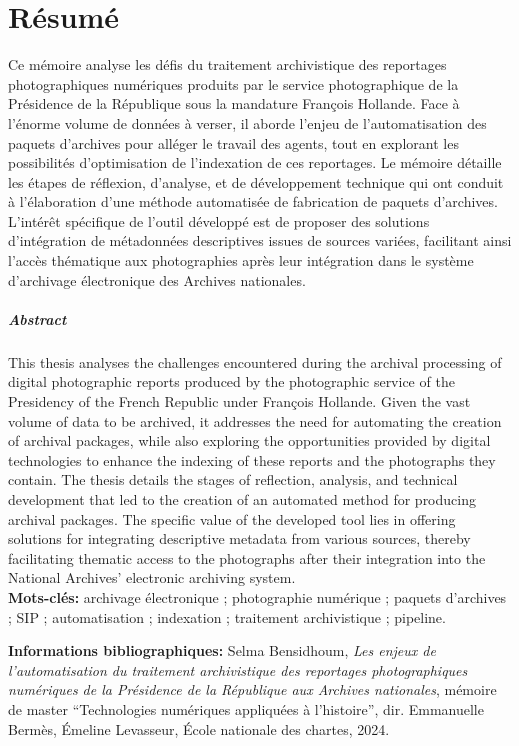 \documentclass[a4paper,12pt,twoside]{book}
\begin{document}
	\chapter*{Résumé}
\medskip Ce mémoire analyse les défis du traitement archivistique des reportages photographiques numériques produits par le service photographique de la Présidence de la République sous la mandature François Hollande. Face à l'énorme volume de données à verser, il aborde l'enjeu de l'automatisation des paquets d'archives pour alléger le travail des agents, tout en explorant les possibilités d'optimisation de l'indexation de ces reportages. Le mémoire détaille les étapes de réflexion, d’analyse, et de développement technique qui ont conduit à l'élaboration d'une méthode automatisée de fabrication de paquets d'archives. L'intérêt spécifique de l'outil développé est de proposer des solutions d'intégration de métadonnées descriptives issues de sources variées, facilitant ainsi l'accès thématique aux photographies après leur intégration dans le système d'archivage électronique des Archives nationales.

\paragraph{Abstract} This thesis analyses the challenges encountered during the archival processing of digital photographic reports produced by the photographic service of the Presidency of the French Republic under François Hollande. Given the vast volume of data to be archived, it addresses the need for automating the creation of archival packages, while also exploring the opportunities provided by digital technologies to enhance the indexing of these reports and the photographs they contain. The thesis details the stages of reflection, analysis, and technical development that led to the creation of an automated method for producing archival packages. The specific value of the developed tool lies in offering solutions for integrating descriptive metadata from various sources, thereby facilitating thematic access to the photographs after their integration into the National Archives' electronic archiving system.
\\
	
	\textbf{Mots-clés:} archivage électronique ; photographie numérique ; paquets d'archives ; SIP ; automatisation ; indexation ; traitement archivistique ; pipeline.
	
	\textbf{Informations bibliographiques:} Selma Bensidhoum, \textit{Les enjeux de l’automatisation du traitement archivistique des reportages photographiques numériques de la Présidence de la République aux Archives nationales}, mémoire de master \enquote{Technologies numériques appliquées à l'histoire}, dir. Emmanuelle Bermès, Émeline Levasseur, École nationale des chartes, 2024.
	
\end{document}
